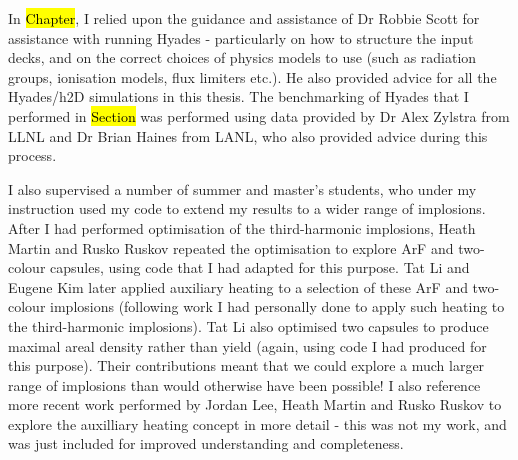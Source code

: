 In \hl{Chapter}, I relied upon the guidance and assistance of Dr Robbie Scott for assistance with running Hyades - particularly on how to structure the input decks, and on the correct choices of physics models to use (such as radiation groups, ionisation models, flux limiters etc.). He also provided advice for all the Hyades/h2D simulations in this thesis. The benchmarking of Hyades that I performed in \hl{Section} was performed using data provided by Dr Alex Zylstra from LLNL and Dr Brian Haines from LANL, who also provided advice during this process.

I also supervised a number of summer and master's students, who under my instruction used my code to extend my results to a wider range of implosions. After I had performed optimisation of the third-harmonic implosions, Heath Martin and Rusko Ruskov repeated the optimisation to explore ArF and two-colour capsules, using code that I had adapted for this purpose. Tat Li and Eugene Kim later applied auxiliary heating to a selection of these ArF and two-colour implosions (following work I had personally done to apply such heating to the third-harmonic implosions). Tat Li also optimised two capsules to produce maximal areal density rather than yield (again, using code I had produced for this purpose). Their contributions meant that we could explore a much larger range of implosions than would otherwise have been possible! I also reference more recent work performed by Jordan Lee, Heath Martin and Rusko Ruskov to explore the auxilliary heating concept in more detail - this was not my work, and was just included for improved understanding and completeness.


